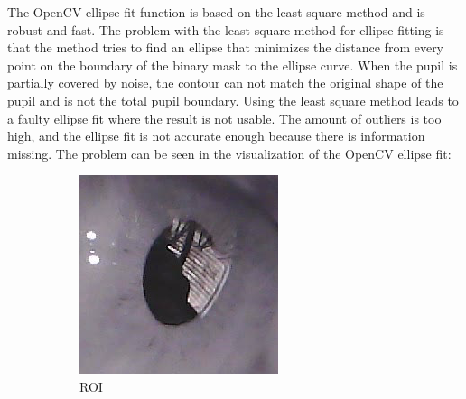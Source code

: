 The OpenCV ellipse fit function is based on the least square method and is robust and fast. The problem with the least square method for ellipse fitting is that the method tries to find an ellipse that minimizes the distance from every point on the boundary of the binary mask to the ellipse curve. When the pupil is partially covered by noise, the contour can not match the original shape of the pupil and is not the total pupil boundary. Using the least square method leads to a faulty ellipse fit where the result is not usable. The amount of outliers is too high, and the ellipse fit is not accurate enough because there is information missing. The problem can be seen in the visualization of the OpenCV ellipse fit:
\begin{figure}[h]
    \centering
    \begin{subfigure}{0.3\textwidth}
        \centering
        \includegraphics[width=0.9\linewidth]{plots/results/roi_text_resutls.png}
        \caption{ROI}
    \end{subfigure}%
    \hfill
    \begin{subfigure}{0.3\textwidth}
        \centering

\end{subfigure}
\end{figure}
